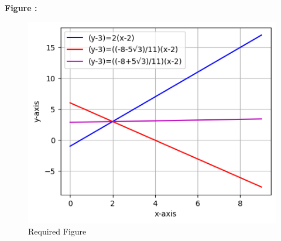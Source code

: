 \documentclass[12pt]{article}
\begin{document}
\textbf{Figure :}
\begin{figure}[H]
    \centering
    \includegraphics[width=\columnwidth]{fig/asgnt.png}
    \caption{Required Figure}
    \label{fig:fig:1}
\end{figure}
\end{document}
